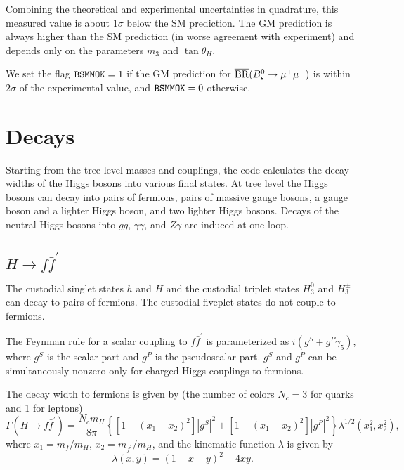 \documentclass[11pt]{article}
\begin{document}
Combining the theoretical and experimental uncertainties in quadrature, this measured value is about $1\sigma$ below the SM prediction.  The GM prediction is always higher than the SM prediction (in worse agreement with experiment) and depends only on the parameters $m_3$ and $\tan\theta_H$.  

We set the flag ${\tt BSMMOK} = 1$ if the GM prediction for $\overline {\rm BR}(B_s^0 \to \mu^+\mu^-)$ is within $2\sigma$ of the experimental value, and ${\tt BSMMOK} = 0$ otherwise.



\section{Decays}
\label{sec:decays}

Starting from the tree-level masses and couplings, the code calculates the decay widths of the Higgs bosons into various final states.  At tree level the Higgs bosons can decay into pairs of fermions, pairs of massive gauge bosons, a gauge boson and a lighter Higgs boson, and two lighter Higgs bosons.  Decays of the neutral Higgs bosons into $gg$, $\gamma\gamma$, and $Z\gamma$ are induced at one loop.

\subsection{$H \to f \bar f^{\prime}$}
\label{sec:Hff}

The custodial singlet states $h$ and $H$ and the custodial triplet states $H_3^0$ and $H_3^{\pm}$ can decay to pairs of fermions.  The custodial fiveplet states do not couple to fermions.

The Feynman rule for a scalar coupling to $f \bar f^{\prime}$ is parameterized as $i (g^S + g^P \gamma_5)$, where $g^S$ is the scalar part and $g^P$ is the pseudoscalar part.  $g^S$ and $g^P$ can be simultaneously nonzero only for charged Higgs couplings to fermions.

The decay width to fermions is given by (the number of colors $N_c = 3$ for quarks and 1 for leptons)
\begin{equation}
	\Gamma(H \to f \bar f^{\prime}) = \frac{N_c m_H}{8 \pi}
	\left\{ \left[ 1 - (x_1 + x_2)^2 \right] |g^S|^2 + \left[ 1 - (x_1 - x_2)^2 \right] |g^P|^2 \right\}
	\lambda^{1/2}(x_1^2, x_2^2),
\end{equation}
where $x_1 = m_f/m_H$, $x_2 = m_{f^{\prime}}/m_H$, and the kinematic function $\lambda$ is given by
\begin{equation}
	\lambda(x,y) = (1 - x - y)^2 - 4xy.
	\label{eq:lambda}
\end{equation}
\end{document}
